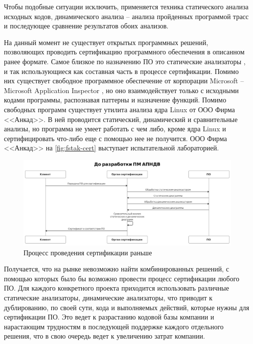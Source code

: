 Чтобы подобные ситуации исключить, применяется техника статического 
анализа исходных кодов, динамического анализа -- анализа пройденных 
программой трасс и последующее сравнение результатов обоих анализов.

На данный момент не существует открытых программных решений,
позволяющих проводить сертификацию программного обеспечения в описанном ранее формате.
Самое близкое по назначению ПО это статические анализаторы \autocite{c-static-analysis},
и так использующиеся как составная часть в процессе сертификации.
Помимо них существует свободное программное обеспечение от корпорации Microsoft --
Microsoft Application Inspector \autocite{microsoft-application-inspector}, но оно
взаимодействует только с исходными кодами программы, распознавая паттерны и назначение
функций.
Помимо свободных программ существует утилита анализа ядра Linux от ООО Фирма <<Анкад>>. 
В ней проводится статический, динамический и сравнительные анализы, но программа не умеет
работать с чем либо, кроме ядра Linux и сертифицировать что-либо еще с помощью нее не получится.
ООО Фирма <<Анкад>> на \autoref{fig:fstak-cert} выступает испытательной лабораторией.

\begin{figure}[!htbp]
    \includegraphics[width=\textwidth,height=\textheight,keepaspectratio]{images/uml_before_cropped.png}
    \caption{Процесс проведения сертификации раньше\label{fig:how-cert-was-before}}
\end{figure}

Получается, что на рынке невозможно найти комбинированных решений, 
с помощью которых было бы возможно провести процесс сертификации любого ПО. 
Для каждого конкретного проекта приходится использовать различные статические анализаторы, 
динамические анализаторы, что приводит к дублированию, по своей сути, кода и выполняемых действий, которые нужны для сертификации ПО.
Это ведет к разрастанию кодовой базы компании и нарастающим трудностям в последующей поддержке
каждого отдельного решения, что в свою очередь ведет к увеличению затрат компании.

